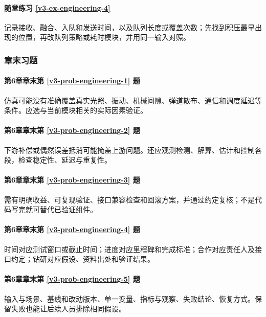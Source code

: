 \paragraph*{随堂练习 \ref{v3-ex-engineering-4}}
\begin{solution}
记录接收、融合、入队和发送时间，以及队列长度或覆盖次数；先找到积压最早出现的位置，再改队列策略或耗时模块，并用同一输入对照。
\end{solution}

\subsubsection*{章末习题}
\paragraph*{第6章章末第 \ref{v3-prob-engineering-1} 题}
\begin{solution}
仿真可能没有准确覆盖真实光照、振动、机械间隙、弹道散布、通信和调度延迟等条件。应选与当前模块相关的实际因素验证。
\end{solution}

\paragraph*{第6章章末第 \ref{v3-prob-engineering-2} 题}
\begin{solution}
下游补偿或偶然误差抵消可能掩盖上游问题。还应观测检测、解算、估计和控制各段，检查稳定性、延迟与重复性。
\end{solution}

\paragraph*{第6章章末第 \ref{v3-prob-engineering-3} 题}
\begin{solution}
需有明确收益、可复现验证、接口兼容检查和回滚方案，并通过约定复核；不是代码写完就可替代已验证组件。
\end{solution}

\paragraph*{第6章章末第 \ref{v3-prob-engineering-4} 题}
\begin{solution}
时间对应测试窗口或截止时间；进度对应里程碑和完成标准；合作对应责任人及接口约定；钻研对应假设、资料出处和验证结果。
\end{solution}

\paragraph*{第6章章末第 \ref{v3-prob-engineering-5} 题}
\begin{solution}
输入与场景、基线和改动版本、单一变量、指标与观察、失败结论、恢复方式。保留失败也能让后续人员排除相同假设。
\end{solution}


